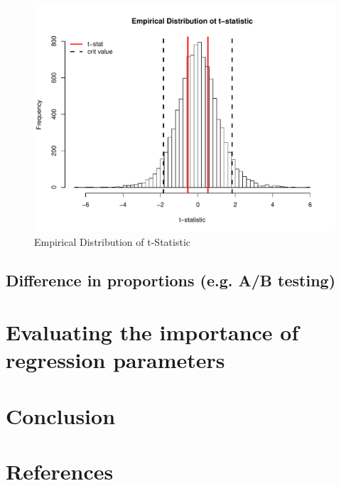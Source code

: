 \documentclass[12pt]{article}
\begin{document}
\begin{figure}[H]\caption[]{Empirical Distribution of t-Statistic}
\centering
\begin{minipage}{0.6\linewidth}
\includegraphics[trim={0cm 0cm 0cm 1.5cm}, clip, scale=0.6]{../figs/ttest_dist.pdf}
\end{minipage}
\end{figure}

\subsection{Difference in proportions (e.g. A/B testing)}

\section{Evaluating the importance of regression parameters}

\section{Conclusion}

\pagebreak
\section{References}
\end{document}
